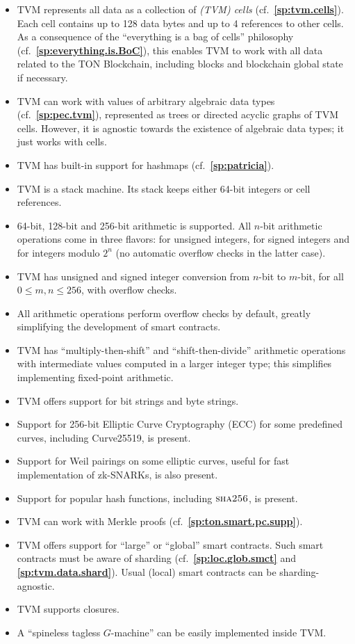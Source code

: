 \documentclass[12pt,oneside]{article}
\def\refpoint#1{{\rm\textbf{\ref{#1}}}}
\let\ptref=\refpoint
\def\opsc#1{\operatorname{\textsc{#1}}}
\def\Sha{\opsc{sha256}}
\begin{document}
\begin{itemize}
\item TVM represents all data as a collection of {\em (TVM) cells\/}
  (cf.~\ptref{sp:tvm.cells}). Each cell contains up to 128 data bytes
  and up to 4 references to other cells. As a consequence of the
  ``everything is a bag of cells'' philosophy
  (cf.~\ptref{sp:everything.is.BoC}), this enables TVM to work with
  all data related to the TON Blockchain, including blocks and
  blockchain global state if necessary.
\item TVM can work with values of arbitrary algebraic data types
  (cf.~\ptref{sp:pec.tvm}), represented as trees or directed acyclic
  graphs of TVM cells. However, it is agnostic towards the existence
  of algebraic data types; it just works with cells.
\item TVM has built-in support for hashmaps (cf.~\ptref{sp:patricia}).
\item TVM is a stack machine. Its stack keeps either 64-bit integers
  or cell references.
\item 64-bit, 128-bit and 256-bit arithmetic is supported. All $n$-bit
  arithmetic operations come in three flavors: for unsigned integers,
  for signed integers and for integers modulo $2^n$ (no automatic
  overflow checks in the latter case).
\item TVM has unsigned and signed integer conversion from $n$-bit to
  $m$-bit, for all $0\leq m,n\leq 256$, with overflow checks.
\item All arithmetic operations perform overflow checks by default,
  greatly simplifying the development of smart contracts.
\item TVM has ``multiply-then-shift'' and ``shift-then-divide''
  arithmetic operations with intermediate values computed in a larger
  integer type; this simplifies implementing fixed-point arithmetic.
\item TVM offers support for bit strings and byte strings.
\item Support for 256-bit Elliptic Curve Cryptography (ECC) for some
  predefined curves, including Curve25519, is present.
\item Support for Weil pairings on some elliptic curves, useful for
  fast implementation of zk-SNARKs, is also present.
\item Support for popular hash functions, including $\Sha$, is
  present.
\item TVM can work with Merkle proofs
  (cf.~\ptref{sp:ton.smart.pc.supp}).
\item TVM offers support for ``large'' or ``global'' smart
  contracts. Such smart contracts must be aware of sharding
  (cf.~\ptref{sp:loc.glob.smct} and \ptref{sp:tvm.data.shard}). Usual
  (local) smart contracts can be sharding-agnostic.
\item TVM supports closures.
\item A ``spineless tagless $G$-machine'' \cite{STGM} can be easily
  implemented inside TVM.
\end{itemize}
\end{document}
